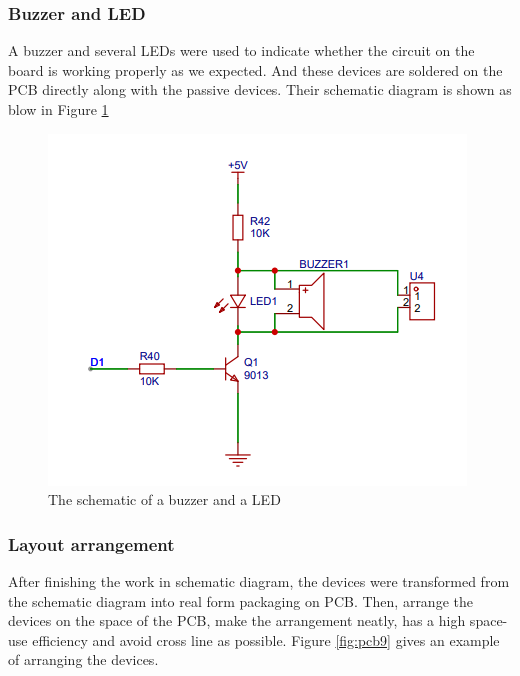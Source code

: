 \documentclass[12pt, a4paper, oneside]{report}
\begin{document}
\subsubsection{Buzzer and LED}
A buzzer and several LEDs were used to indicate whether the circuit on the board is working properly as we expected. And these devices are soldered on the PCB directly along with the passive devices. Their schematic diagram is shown as blow in Figure \ref{fig:pcb8}
\begin{figure}[!h]
	\centering
	\includegraphics[scale=0.7]{pic/PCB_figure/8_PCB.png}
	\caption{The schematic of a buzzer and a LED}
    \label{fig:pcb8}
\end{figure}
\subsubsection{Layout arrangement}
After finishing the work in schematic diagram, the devices were transformed from the schematic diagram into real form packaging on PCB. Then, arrange the devices on the space of the PCB, make the arrangement neatly, has a high space-use efficiency and avoid cross line as possible. Figure \ref{fig:pcb9} gives an example of arranging the devices.
\end{document}
